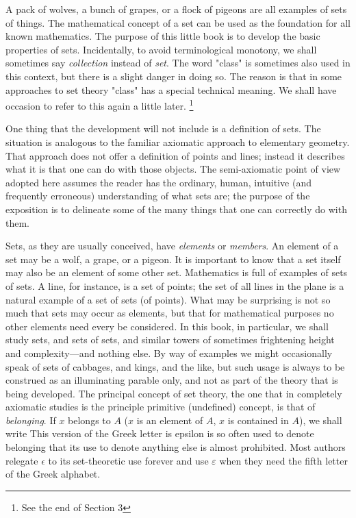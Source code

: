   A pack of wolves, a bunch of grapes, or a flock of pigeons are all examples of sets of things. 
 The mathematical concept of a set can be used as the foundation for all known mathematics. 
 The purpose of this little book is to develop the basic properties of sets. 
 Incidentally, to avoid terminological monotony, we shall sometimes say \textit{collection} instead of \textit{set}. 
 The word "class" is sometimes also used in this context, but there is a slight danger in doing so. 
 The reason is that in some approaches to set theory "class" has a special technical meaning. 
 We shall have occasion to refer to this again a little later. 
   \footnote{
     See the end of Section 3 
   }


 One thing that the development will not include is a definition of sets. 
 The situation is analogous to the familiar axiomatic approach to elementary geometry. 
 That approach does not offer a definition of points and lines; instead it describes what it is that one can do with those objects. 
 The semi-axiomatic point of view adopted here assumes the reader has the ordinary, human, intuitive (and frequently erroneous) understanding of what sets are; the purpose of the exposition is to delineate some of the many things that one can correctly do with them.


  Sets, as they are usually conceived, have \textit{elements} or \textit{members}. 
 An element of a set may be a wolf, a grape, or a pigeon. 
 It is important to know that a set itself may also be an element of some other set. 
 Mathematics is full of examples of sets of sets. 
 A line, for instance, is a set of points; the set of all lines in the plane is a natural example of a set of sets (of points). 
 What may be surprising is not so much that sets may occur as elements, but that for mathematical purposes no other elements need every be considered. 
 In this book, in particular, we shall study sets, and sets of sets, and similar towers of sometimes frightening height and complexity---and nothing else. 
 By way of examples we might occasionally speak of sets of cabbages, and kings, and the like, but such usage is always to be construed as an illuminating parable only, and not as part of the theory that is being developed. 
 The principal concept of set theory, the one that in completely axiomatic studies is the principle primitive (undefined) concept, is that of \textit{belonging}. 
 If $x$ belongs to $A$ ($x$ is an element of $A$, $x$ is contained in $A$), we shall write  
 This version of the Greek letter is epsilon is so often used to denote belonging that its use to denote anything else is almost prohibited. 
 Most authors relegate $\epsilon$ to its set-theoretic use forever and use $\varepsilon$ when they need the fifth letter of the Greek alphabet. 



